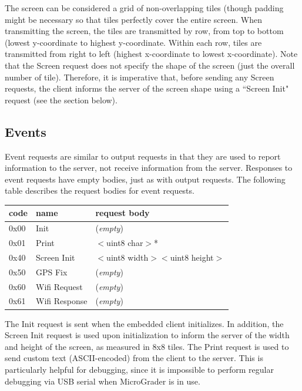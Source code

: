 \documentclass[12pt]{article}
\begin{document}
The screen can be considered a grid of non-overlapping tiles (though padding might be necessary so that tiles perfectly cover the entire screen.  When transmitting the screen, the tiles are transmitted by row, from top to bottom (lowest y-coordinate to highest y-coordinate.  Within each row, tiles are transmitted from right to left (highest x-coordinate to lowest x-coordinate).  Note that the Screen request does not specify the shape of the screen (just the overall number of tile).  Therefore, it is imperative that, before sending any Screen requests, the client informs the server of the screen shape using a ``Screen Init" request (see the section below).

\subsection{Events}
Event requests are similar to output requests in that they are used to report information to the server, not receive information from the server.  Responses to event requests have empty bodies, just as with output requests.  The following table describes the request bodies for event requests.

\begin{center}
\begin{tabular}{l l l}
code & name & request body \\ \hline
0x00 & Init & (\textit{empty}) \\
0x01 & Print & $<$uint8 char$>$* \\
0x40 & Screen Init & $<$uint8 width$>$$<$uint8 height$>$ \\
0x50 & GPS Fix & (\textit{empty}) \\
0x60 & Wifi Request & (\textit{empty}) \\
0x61 & Wifi Response & (\textit{empty}) \\ \hline
\end{tabular}
\end{center}

\vspace{5mm}

The Init request is sent when the embedded client initializes.  In addition, the Screen Init request is used upon initialization to inform the server of the width and height of the screen, as measured in 8x8 tiles.  The Print request is used to send custom text (ASCII-encoded) from the client to the server.  This is particularly helpful for debugging, since it is impossible to perform regular debugging via USB serial when MicroGrader is in use.
\end{document}
